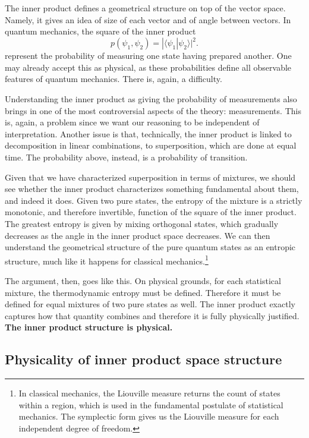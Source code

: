 \documentclass[10pt,twocolumn, nofootinbib]{revtex4-2}
\def\>{\rangle}
\def\<{\langle}
\begin{document}
The inner product defines a geometrical structure on top of the vector space. Namely, it gives an idea of size of each vector and of angle between vectors. In quantum mechanics, the square of the inner product
\begin{equation}
	p(\psi_1, \psi_2) = |\<\psi_1| \psi_2\>|^2.
\end{equation}
represent the probability of measuring one state having prepared another. One may already accept this as physical, as these probabilities define all observable features of quantum mechanics. There is, again, a difficulty.

Understanding the inner product as giving the probability of measurements also brings in one of the most controversial aspects of the theory: measurements. This is, again, a problem since we want our reasoning to be independent of interpretation. Another issue is that, technically, the inner product is linked to decomposition in linear combinations, to superposition, which are done at equal time. The probability above, instead, is a probability of transition.

Given that we have characterized superposition in terms of mixtures, we should see whether the inner product characterizes something fundamental about them, and indeed it does. Given two pure states, the entropy of the mixture is a strictly monotonic, and therefore invertible, function of the square of the inner product. The greatest entropy is given by mixing orthogonal states, which gradually decreases as the angle in the inner product space decreases. We can then understand the geometrical structure of the pure quantum states as an entropic structure, much like it happens for classical mechanics.\footnote{In classical mechanics, the Liouville measure returns the count of states within a region, which is used in the fundamental postulate of statistical mechanics. The symplectic form gives us the Liouville measure for each independent degree of freedom.}

The argument, then, goes like this. On physical grounds, for each statistical mixture, the thermodynamic entropy must be defined. Therefore it must be defined for equal mixtures of two pure states as well. The inner product exactly captures how that quantity combines and therefore it is fully physically justified. \textbf{The inner product structure is physical.}


\subsection{Physicality of inner product space structure}
\end{document}
